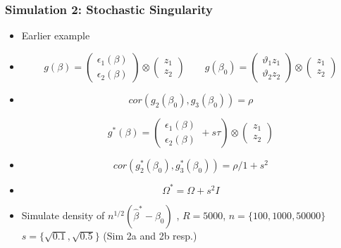 \documentclass{beamer}
\begin{document}
  \begin{frame}
  \frametitle{Simulation 2: Stochastic Singularity }
  \begin{itemize}
  \item[] Earlier example   \item[]\begin{equation*}  g(\beta)= \left(\begin{array}{c} \epsilon_{1}(\beta) \\  \epsilon_{2}(\beta) \end{array}\right) \otimes \left(\begin{array}{c} z_1 \\ z_2 \end{array} \right) \qquad g(\beta_0)=\left(\begin{array}{c} \vartheta_{1}z_1 \\  \vartheta_{2}z_2 \end{array}\right) \otimes \left(\begin{array}{c} z_1 \\ z_2 \end{array} \right) \end{equation*}
      \item[] \begin{equation*} cor(g_2(\beta_0),g_3(\beta_0))=\rho \end{equation*}

      \begin{equation}  g^*(\beta)= \left(\begin{array}{c} \epsilon_{1}(\beta) \\  \epsilon_{2}(\beta) \end{array}+s \tau \right) \otimes \left(\begin{array}{c} z_1 \\ z_2 \end{array} \right)\end{equation}
 \item[] \begin{equation*} cor(g_2^*(\beta_0),g_3^*(\beta_0))=\rho/1+s^2 \end{equation*}
      \item[]\begin{equation*} \Omega^*=\Omega+s^2 I \end{equation*}
    \item[]  Simulate  density of $n^{1/2}(\hat{\beta}^*-\beta_0)$ , $R=5000$, $n=\{100,1000,50000\}$ $s=\{\sqrt{0.1},\sqrt{0.5}\}$ (Sim 2a and 2b resp.)


    \end{itemize}
    \end{frame}
\end{document}
